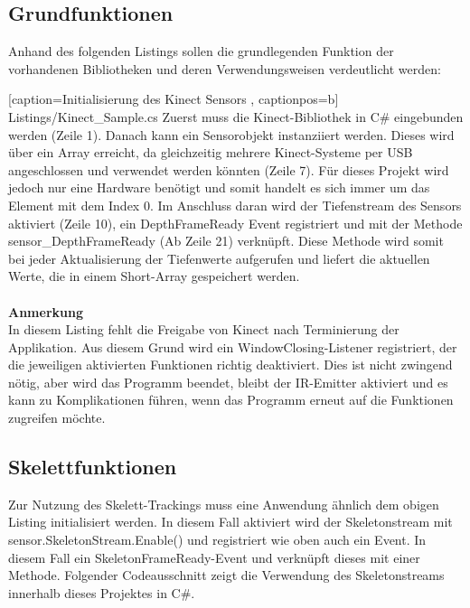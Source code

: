 %
%

\subsection{Grundfunktionen}
Anhand des folgenden Listings sollen die grundlegenden Funktion der vorhandenen Bibliotheken und deren Verwendungsweisen verdeutlicht werden:


    [caption={Initialisierung des Kinect Sensors \cite{pdf:maccormick}}
       \label{lst:kinect_sdk},
       captionpos=b]
 {Listings/Kinect_Sample.cs}
\noindent
Zuerst muss die Kinect-Bibliothek in C\# eingebunden werden (Zeile 1). Danach kann ein Sensorobjekt instanziiert werden. Dieses wird über ein Array erreicht, da gleichzeitig mehrere Kinect-Systeme per USB angeschlossen und verwendet werden könnten (Zeile 7). Für dieses Projekt wird jedoch nur eine Hardware benötigt und somit handelt es sich immer um das Element mit dem Index 0. Im Anschluss daran wird der Tiefenstream des Sensors aktiviert (Zeile 10), ein \textsf{DepthFrameReady} Event registriert und mit der Methode \textsf{sensor\_DepthFrameReady} (Ab Zeile 21) verknüpft. Diese Methode wird somit bei jeder Aktualisierung der Tiefenwerte aufgerufen und liefert die aktuellen Werte, die in einem Short-Array gespeichert werden. \\ \\
\textbf{Anmerkung}\\
In diesem Listing fehlt die Freigabe von Kinect nach Terminierung der Applikation. Aus diesem Grund wird
ein WindowClosing-Listener registriert, der die jeweiligen aktivierten Funktionen richtig deaktiviert. Dies ist nicht zwingend nötig, aber wird das Programm beendet, bleibt der IR-Emitter aktiviert und es kann zu Komplikationen führen, wenn das Programm erneut auf die Funktionen zugreifen möchte.

\subsection{Skelettfunktionen}
Zur Nutzung des Skelett-Trackings muss eine Anwendung ähnlich dem obigen Listing initialisiert werden.
In diesem Fall aktiviert wird der Skeletonstream mit \textsf{sensor.SkeletonStream.Enable()} und registriert wie oben auch ein Event. In diesem Fall ein \textsf{SkeletonFrameReady}-Event und verknüpft dieses mit einer Methode. Folgender Codeausschnitt zeigt die Verwendung des Skeletonstreams innerhalb dieses Projektes in C\#.\\

